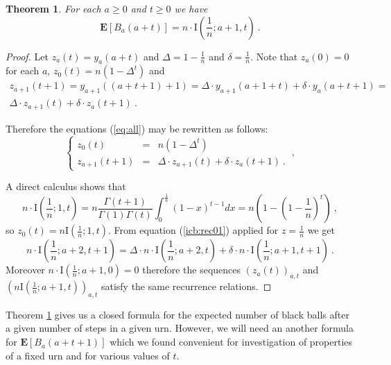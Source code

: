 \documentclass[submission]{dmtcs}
\newtheorem{theorem}{Theorem}
\newcommand{\E}[1]{\mathbf{E}\left[#1\right]}
\newcommand{\IBETAREGn}[2]{\mathrm{I}\left(\frac1n;#1,#2\right)}
\begin{document}
\begin{theorem} 
\label{thm:IBF}
For each $a\geq 0$ and $t\geq 0$ we have
$$
  \E{B_{a}(a+t)} = n \cdot \IBETAREGn{a+1}{t} ~.
$$
\end{theorem}

\begin{proof}
Let $z_a(t) = y_a(a+t)$ and $\Delta = 1 - \frac1n$ and $\delta = \frac1n$.
Note that $z_{a}(0) = 0$ for each $a$, 
$z_{0}(t) =  n(1 - \Delta^t)$ and
\begin{gather*}
z_{a+1}(t+1) = y_{a+1}((a+t+1)+1) =
\Delta \cdot y_{a+1}(a+1+t)  + \delta \cdot y_{a}(a+t+1) = \\
\Delta\cdot z_{a+1}(t) + \delta\cdot z_{a}(t+1)~.
\end{gather*}

Therefore the equations (\ref{eq:all}) may be rewritten
as follows:
\begin{equation}
\label{eq:allX}
\left\{
\begin{array}{rcl}
z_{0}(t)   &=& n(1 - \Delta^t)\\
z_{a+1}(t+1) &=& \Delta\cdot z_{a+1}(t) + \delta\cdot z_{a}(t+1)~.
\end{array}
\right. ~,
\end{equation}

A direct calculus shows that
$$
n \cdot \IBETAREGn{1}{t} =  n \frac{\Gamma(t+1)}{\Gamma(1)\Gamma(t)} \int_{0}^{\frac1n} (1-x)^{t-1} dx = 
n \left(1- \left(1-\frac1n\right)^t\right) ~,
$$
so $z_0(t) = n \IBETAREGn{1}{t}$.
From equation (\ref{icb:rec01}) applied for $z=\frac1n$
we get 
\begin{equation}
   n \cdot \IBETAREGn{a+2}{t+1} = 
   \Delta \cdot n \cdot \IBETAREGn{a+2}{t} +\delta\cdot n \cdot \IBETAREGn{a+1}{t+1} ~.
\end{equation}
Moreover  $n \cdot \IBETAREGn{a+1}{0} = 0$
therefore the sequences $(z_a(t))_{a,t}$ and $(n \IBETAREGn{a+1}{t})_{a,t}$ 
satisfy the same recurrence relations.
\end{proof}



Theorem \ref{thm:IBF} gives us a closed formula for the 
expected number of black balls after a given number of steps in a given urn.
However, we will need an another formula for 
$\E{B_{a}(a+t+1)}$ which we found convenient for investigation of 
properties of a fixed urn and for various values of $t$. 
\end{document}
